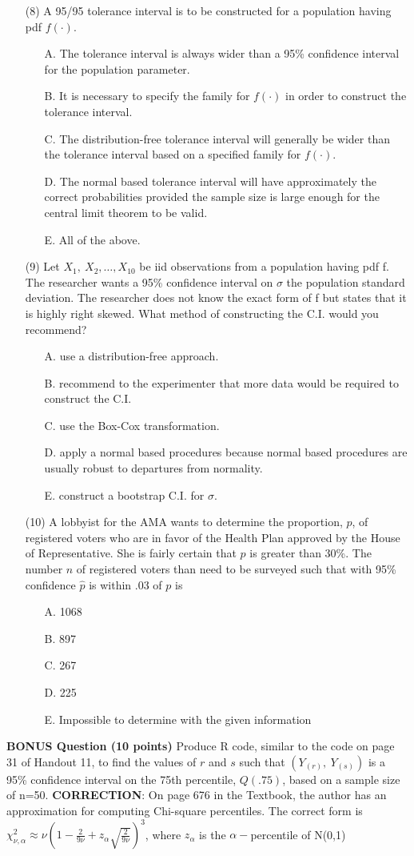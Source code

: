 \documentclass[10pt]{report}
\def\be{\begin{enumerate}}
\def\ee{\end{enumerate}}
\def\vvn{\vskip2mm\noindent}
\begin{document}
\begin{enumerate}
\item[(8)]  A 95/95 tolerance interval is  to
 be constructed for a population having
 pdf  $f(\cdot)$.
\be
\item[A.] The tolerance interval is always wider than a 95\%
  confidence interval for the population parameter.
\item[B.] It is necessary to specify the family for $f(\cdot)$ in
  order to construct the tolerance interval.
\item[C.] The distribution-free tolerance interval will generally be
  wider than the tolerance interval based on  a specified family for
  $f(\cdot)$.
\item[D.] The normal based tolerance interval will have approximately
  the correct probabilities provided the sample size is large enough
  for the central limit theorem to be valid.
\item[E.] All of the above.
\ee
\vfill\newpage
\item[(9)] Let $X_1,\ X_2,\ldots,X_{10}$ be iid observations from a population
having pdf f. The researcher wants a 95\% confidence interval on $\sigma$
the population standard deviation. The researcher does not know the exact form of f
but states that it is highly right skewed. What method of constructing the C.I. would
you recommend?
\be
\item[A.] use a distribution-free approach.
\item[B.] recommend to the experimenter that more data would be required to construct the C.I.
\item[C.] use the Box-Cox transformation.
\item[D.] apply a normal based procedures because normal based procedures are usually
  robust to departures from normality.
\item[E.] construct a bootstrap C.I. for $\sigma$.
\ee
\item[(10)] A lobbyist for the AMA wants to determine the proportion, $p$, of registered voters who are in favor
of the Health Plan approved by the House of Representative. She is fairly certain that $p$ is greater than 30\%.
The number $n$ of registered voters than need to be surveyed such that with 95\% confidence $\widehat{p}$ is within .03 of $p$ is
\be
\item[A.] 1068
\item[B.] 897
\item[C.] 267
\item[D.] 225
\item[E.] Impossible to determine with the given information
\ee\ee
\vskip20mm\vvn
{\bf BONUS Question (10 points)} Produce R code, similar to the code on page 31 of Handout 11, to find the values of $r$ and $s$ such 
that $(Y_{(r)},\ Y_{(s)})$ is a 95\% confidence interval on the 75th percentile, $Q(.75)$, based on a sample size of n=50.
\vskip20mm
\vvn\vvn\vvn
{\bf CORRECTION}: On page 676 in the Textbook, the author has an approximation for computing
Chi-square percentiles. The correct form is
\vskip2mm
$\chi^2_{\nu,\alpha} \approx \nu \left (1-\frac{2}{9\nu}+z_{\alpha}\sqrt{\frac{2}{9\nu}}\right )^3$, where $z_{\alpha}$ is the $\alpha-$percentile of N(0,1)


\vfill
\end{document}
